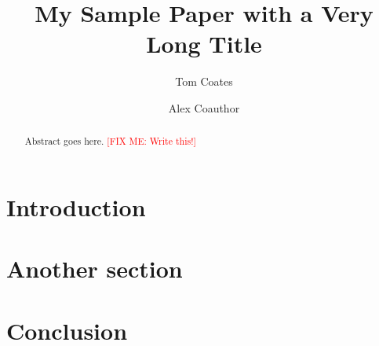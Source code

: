 \documentclass[11pt,a4paper]{amsart}
\title[My Sample Paper] {My Sample Paper with a Very Long Title}
\author[Coates]{Tom Coates}
\author[Coauthor]{Alex Coauthor}
\newcommand{\fixme}[1]{\textcolor{red}{[FIX ME: #1]}}
\theoremstyle{plain}
\theoremstyle{definition}
\begin{document}
\begin{abstract}
	Abstract goes here. \fixme{Write this!}
\end{abstract}

\maketitle

\section{Introduction}

\section{Another section}

\section{Conclusion}



\end{document}
